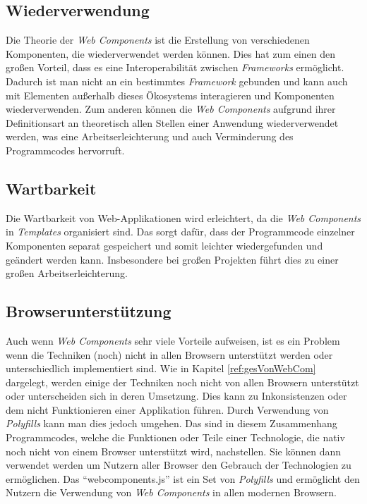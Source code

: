 \documentclass[12pt, paper=a4, bibtotoc, toc=listof, headsepline=true, numbers=endperiod]{scrreprt}
\begin{document}
			\subsection{Wiederverwendung}
			Die Theorie der \emph{Web Components} ist die Erstellung von verschiedenen Komponenten, die wiederverwendet werden können. Dies hat zum einen den großen Vorteil, dass es eine Interoperabilität zwischen \emph{Frameworks} ermöglicht\cite[S.2]{patel2015learning}. Dadurch ist man nicht an ein bestimmtes \emph{Framework} gebunden und kann auch mit Elementen außerhalb dieses Ökosystems interagieren und Komponenten wiederverwenden. Zum anderen können die \emph{Web Components} aufgrund ihrer Definitionsart an theoretisch allen Stellen einer Anwendung wiederverwendet werden, was eine Arbeitserleichterung und auch Verminderung des Programmcodes hervorruft. 
			\subsection{Wartbarkeit}
			Die Wartbarkeit von Web-Applikationen wird erleichtert, da die \emph{Web Components} in \emph{Templates} organisiert sind\cite[S.2]{patel2015learning}. Das sorgt dafür, dass der Programmcode einzelner Komponenten separat gespeichert und somit leichter wiedergefunden und geändert werden kann. Insbesondere bei großen Projekten führt dies zu einer großen Arbeitserleichterung.
			\subsection{Browserunterstützung}
			\label{sec:broUnt}
			Auch wenn \emph{Web Components} sehr viele Vorteile aufweisen, ist es ein Problem wenn die Techniken (noch) nicht in allen Browsern unterstützt werden oder unterschiedlich implementiert sind. Wie in Kapitel \ref{ref:gesVonWebCom} dargelegt, werden einige der Techniken noch nicht von allen Browsern unterstützt oder unterscheiden sich in deren Umsetzung. Dies kann zu Inkonsistenzen oder dem nicht Funktionieren einer Applikation führen. Durch Verwendung von  \emph{Polyfills} kann man dies jedoch umgehen. Das sind in diesem Zusammenhang Programmcodes, welche die Funktionen oder Teile einer Technologie, die nativ noch nicht von einem Browser unterstützt wird, nachstellen. Sie können dann verwendet werden um Nutzern aller Browser den Gebrauch der Technologien zu ermöglichen\cite[S.4]{satrom2014building}. Das \enquote{webcomponents.js} ist ein Set von \emph{Polyfills} und ermöglicht den Nutzern die Verwendung von \emph{Web Components} in allen modernen Browsern\cite{webComJs}.
\end{document}
